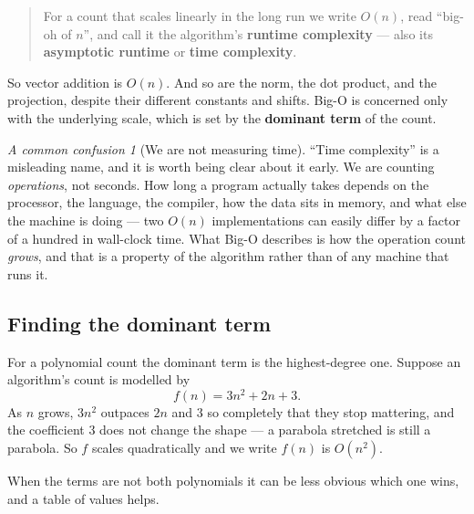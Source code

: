 \documentclass[11pt]{article}
\theoremstyle{plain}
\theoremstyle{definition}
\theoremstyle{remark}
\newtheorem*{warn}{A common confusion}
\begin{document}
\begin{quote}
For a count that scales linearly in the long run we write $O(n)$, read
``big-oh of $n$'', and call it the algorithm's \textbf{runtime complexity} ---
also its \textbf{asymptotic runtime} or \textbf{time complexity}.
\end{quote}

\noindent So vector addition is $O(n)$. And so are the norm, the dot product,
and the projection, despite their different constants and shifts. Big-O is
concerned only with the underlying scale, which is set by the \textbf{dominant
term} of the count.

\begin{warn}[We are not measuring time]
``Time complexity'' is a misleading name, and it is worth being clear about it
early. We are counting \emph{operations}, not seconds. How long a program
actually takes depends on the processor, the language, the compiler, how the
data sits in memory, and what else the machine is doing --- two $O(n)$
implementations can easily differ by a factor of a hundred in wall-clock time.
What Big-O describes is how the operation count \emph{grows}, and that is a
property of the algorithm rather than of any machine that runs it.
\end{warn}

\subsection{Finding the dominant term}
For a polynomial count the dominant term is the highest-degree one. Suppose an
algorithm's count is modelled by
\[
  f(n) = 3n^{2} + 2n + 3 .
\]
As $n$ grows, $3n^{2}$ outpaces $2n$ and $3$ so completely that they stop
mattering, and the coefficient $3$ does not change the shape --- a parabola
stretched is still a parabola. So $f$ scales quadratically and we write
$f(n)$ is $O(n^{2})$.

When the terms are not both polynomials it can be less obvious which one wins,
and a table of values helps.
\end{document}
